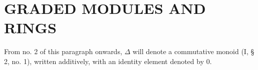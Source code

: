 \section{GRADED MODULES AND RINGS}

From no. 2 of this paragraph onwards, \(\Delta\) will denote a commutative monoid (I, § 2, no. 1), written additively, with an identity element denoted by 0.

